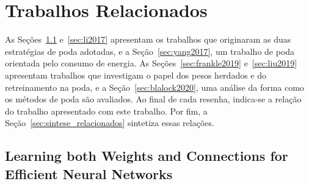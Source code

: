 
\chapter{Trabalhos Relacionados}\label{chap:trabalhos_relacionados}


As Seções~\ref{sec:han2015} e~\ref{sec:li2017} apresentam os trabalhos que originaram as duas
estratégias de poda adotadas, e a Seção~\ref{sec:yang2017}, um trabalho de poda orientada pelo
consumo de energia. As Seções~\ref{sec:frankle2019} e~\ref{sec:liu2019} apresentam trabalhos que
investigam o papel dos pesos herdados e do retreinamento na poda, e a
Seção~\ref{sec:blalock2020}, uma análise da forma como os métodos de poda são avaliados. Ao
final de cada resenha, indica-se a relação do trabalho apresentado com este trabalho. Por fim, a
Seção~\ref{sec:sintese_relacionados} sintetiza essas relações.

\section{Learning both Weights and Connections for Efficient Neural Networks}\label{sec:han2015}

